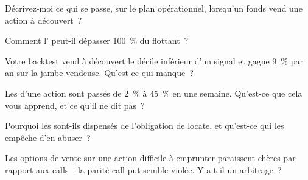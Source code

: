 \begin{interviewq}\label{iq:m1:stock-loan-and-short-selling:1}
Décrivez-moi ce qui se passe, sur le plan opérationnel, lorsqu'un fonds vend une action à découvert~?
\end{interviewq}

\begin{interviewq}\label{iq:m1:stock-loan-and-short-selling:2}
Comment l' peut-il dépasser 100~\% du flottant~?
\end{interviewq}

\begin{interviewq}\label{iq:m1:stock-loan-and-short-selling:3}
Votre backtest vend à découvert le décile inférieur d'un signal et gagne 9~\% par an sur
la jambe vendeuse. Qu'est-ce qui manque~?
\end{interviewq}

\begin{interviewq}\label{iq:m1:stock-loan-and-short-selling:4}
Les  d'une action sont passés de 2~\% à 45~\% en une semaine. Qu'est-ce que cela
vous apprend, et ce qu'il ne dit pas~?
\end{interviewq}

\begin{interviewq}\label{iq:m1:stock-loan-and-short-selling:5}
Pourquoi les  sont-ils dispensés de l'obligation de locate, et qu'est-ce qui
les empêche d'en abuser~?
\end{interviewq}

\begin{interviewq}\label{iq:m1:stock-loan-and-short-selling:6}
Les options de vente sur une action difficile à emprunter paraissent chères par rapport aux calls~: la
parité call-put semble violée. Y a-t-il un arbitrage~?
\end{interviewq}
